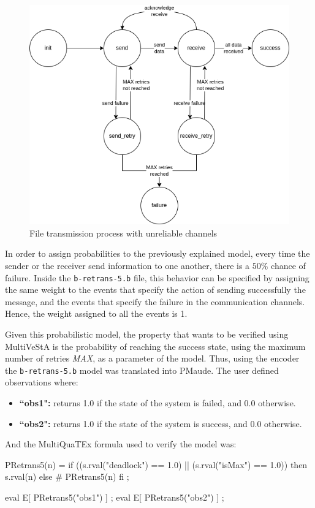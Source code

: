 \begin{figure}[H]
    \centering
    \includegraphics[scale = 0.6]{images/CS8.png}
    \caption{File transmission process with unreliable channels}
    \label{fig:cs8}
\end{figure}
In order to assign probabilities to the previously explained model, every time the sender or the receiver send information to one another, there is a $50\%$ chance of failure. Inside the \texttt{b-retrans-5.b} file, this behavior can be specified by assigning the same weight to the events that specify the action of sending successfully the message, and the events that specify the failure in the communication channels. Hence, the weight assigned to all the events is 1.

Given this probabilistic model, the property that wants to be verified using MultiVeStA is the probability of reaching the success state, using the maximum number of retries \textit{MAX}, as a parameter of the model. Thus, using the encoder the \texttt{b-retrans-5.b} model was translated into PMaude. The user defined observations where:
\begin{itemize}
    \item \textbf{``obs1":} returns 1.0 if the state of the system is failed, and 0.0 otherwise.
    \item \textbf{``obs2":} returns 1.0 if the state of the system is success, and 0.0 otherwise.
\end{itemize}
And the MultiQuaTEx formula used to verify the model was:
\begin{maude2}

PRetrans5(n) = if ((s.rval("deadlock") == 1.0) || (s.rval("isMax") == 1.0)) 
               then s.rval(n) else # PRetrans5(n) fi ;

eval E[ PRetrans5("obs1") ] ;
eval E[ PRetrans5("obs2") ] ;
\end{maude2}

